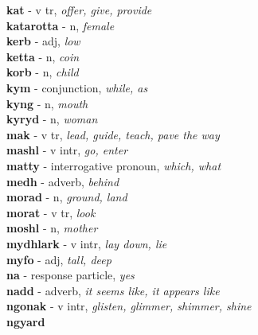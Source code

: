 \vspace{7pt}\textbf{kat}   - v tr, \emph{offer, give, provide}\\ \vspace{7pt}\textbf{katarotta}   - n, \emph{female}\\ \vspace{7pt}\textbf{kerb}   - adj, \emph{low}\\ \vspace{7pt}\textbf{ketta}   - n, \emph{coin}\\ \vspace{7pt}\textbf{korb}   - n, \emph{child}\\ \vspace{7pt}\textbf{kym}   - conjunction, \emph{while, as}\\ \vspace{7pt}\textbf{kyng}   - n, \emph{mouth}\\ \vspace{7pt}\textbf{kyryd}   - n, \emph{woman}\\ \vspace{7pt}\textbf{mak}   - v tr, \emph{lead, guide, teach, pave the way}\\ \vspace{7pt}\textbf{mashl}   - v intr, \emph{go, enter}\\ \vspace{7pt}\textbf{matty}   - interrogative pronoun, \emph{which, what}\\ \vspace{7pt}\textbf{medh}   - adverb, \emph{behind}\\ \vspace{7pt}\textbf{morad}   - n, \emph{ground, land}\\ \vspace{7pt}\textbf{morat}   - v tr, \emph{look}\\ \vspace{7pt}\textbf{moshl}   - n, \emph{mother}\\ \vspace{7pt}\textbf{mydhlark}   - v intr, \emph{lay down, lie}\\ \vspace{7pt}\textbf{myfo}   - adj, \emph{tall, deep}\\ \vspace{7pt}\textbf{na}   - response particle, \emph{yes}\\ \vspace{7pt}\textbf{nadd}   - adverb, \emph{it seems like, it appears like}\\ \vspace{7pt}\textbf{ngonak}   - v intr, \emph{glisten, glimmer, shimmer, shine}\\ \vspace{7pt}\textbf{ngyard} 